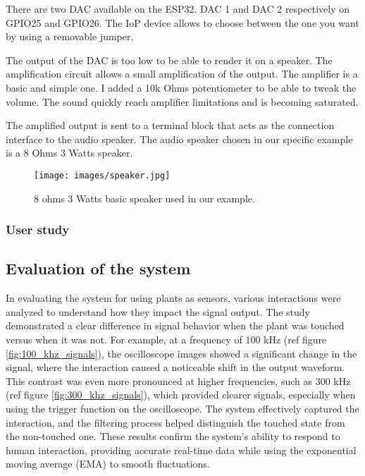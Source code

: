 
There are two DAC available on the ESP32. DAC 1 and DAC 2 respectively on GPIO25 and GPIO26. The IoP device allows
to choose between the one you want by using a removable jumper.

The output of the DAC is too low to be able to render it on a speaker. The amplification circuit allows a small
amplification of the output. The amplifier is a basic and simple one. I added a 10k Ohms potentiometer to be able to
tweak the volume. The sound quickly reach amplifier limitations and is becoming saturated.

The amplified output is sent to a terminal block that acts as the connection interface to the audio speaker.
The audio speaker chosen in our specific example is a 8 Ohms 3 Watts speaker.

\begin{figure}[h!]
    \centering
    \texttt{[image: images/speaker.jpg]}
    \caption{8 ohms 3 Watts basic speaker used in our example.}
    \vspace{0.1cm}
    \label{fig:speaker}
\end{figure}


\newpage
\subsubsection{User study}

\subsection{Evaluation of the system}

In evaluating the system for using plants as sensors, various interactions were analyzed to understand how they impact the signal output. The study demonstrated a clear difference in signal behavior when the plant was touched versus when it was not. For example, at a frequency of 100 kHz (ref figure \ref{fig:100_khz_signals}), the oscilloscope images showed a significant change in the signal, where the interaction caused a noticeable shift in the output waveform. This contrast was even more pronounced at higher frequencies, such as 300 kHz (ref figure \ref{fig:300_khz_signals}), which provided clearer signals, especially when using the trigger function on the oscilloscope. The system effectively captured the interaction, and the filtering process helped distinguish the touched state from the non-touched one. These results confirm the system's ability to respond to human interaction, providing accurate real-time data while using the exponential moving average (EMA) to smooth fluctuations.

